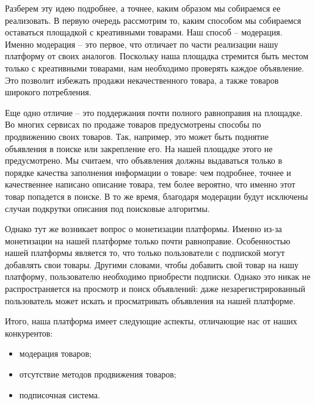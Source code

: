\documentclass[a4paper,14pt]{extarticle}
\begin{document}
Разберем эту идею подробнее, а точнее, каким образом мы собираемся ее реализовать. В первую очередь рассмотрим то, каким способом мы собираемся оставаться площадкой с креативными товарами. Наш способ -- модерация. Именно модерация -- это первое, что отличает по части реализации нашу платформу от своих аналогов. Поскольку наша площадка стремится быть местом только с креативными товарами, нам необходимо проверять каждое объявление. Это позволит избежать продажи некачественного товара, а также товаров широкого потребления.

Еще одно отличие -- это поддержания почти полного равноправия на площадке. Во многих сервисах по продаже товаров предусмотрены способы по продвижению своих товаров. Так, например, это может быть поднятие объявления в поиске или закрепление его. На нашей площадке этого не предусмотрено. Мы считаем, что объявления должны выдаваться только в порядке качества заполнения информации о товаре: чем подробнее, точнее и качественнее написано описание товара, тем более вероятно, что именно этот товар попадется в поиске. В то же время, благодаря модерации будут исключены случаи подкрутки описания под поисковые алгоритмы.

Однако тут же возникает вопрос о монетизации платформы. Именно из-за монетизации на нашей платформе только почти равноправие. Особенностью нашей платформы является то, что только пользователи с подпиской могут добавлять свои товары. Другими словами, чтобы добавить свой товар на нашу платформу, пользователю необходимо приобрести подписки. Однако это никак не распространяется на просмотр и поиск объявлений: даже незарегистрированный пользователь может искать и просматривать объявления на нашей платформе.

Итого, наша платформа имеет следующие аспекты, отличающие нас от наших конкурентов:
\begin{itemize}
    \item модерация товаров;
    \item отсутствие методов продвижения товаров;
    \item подписочная система.
\end{itemize}


\end{document}
